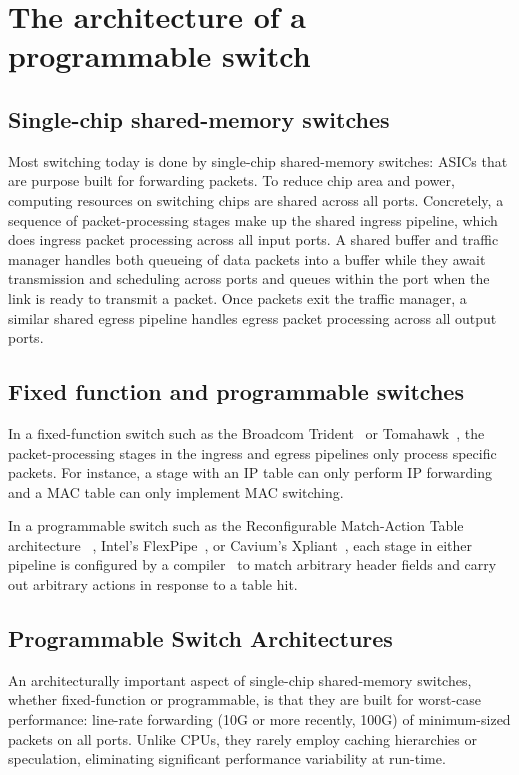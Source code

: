 \section{The architecture of a programmable switch}
\label{s:architecture}

\subsection{Single-chip shared-memory switches}

Most switching today is done by single-chip shared-memory switches: ASICs that
are purpose built for forwarding packets. To reduce chip area and power,
computing resources on switching chips are shared across all ports.
Concretely, a sequence of packet-processing stages make up the shared ingress
pipeline, which does ingress packet processing across all input ports. A shared
buffer and traffic manager handles both queueing of data packets into a buffer
while they await transmission and scheduling across ports and queues within the
port when the link is ready to transmit a packet. Once packets exit the traffic
manager, a similar shared egress pipeline handles egress packet processing across
all output ports.

\subsection{Fixed function and programmable switches}

In a fixed-function switch such as the Broadcom Trident~\cite{trident} or
Tomahawk~\cite{tomahawk}, the packet-processing stages in the ingress and
egress pipelines only process specific packets. For instance, a stage with an
IP table can only perform IP forwarding and a MAC table can only implement MAC
switching.

In a programmable switch such as the Reconfigurable Match-Action Table
architecture ~\cite{rmt}, Intel's FlexPipe~\cite{flexpipe}, or Cavium's
Xpliant~\cite{xpliant}, each stage in either pipeline is configured by a
compiler~\cite{lavanya_nsdi} to match arbitrary header fields and carry out
arbitrary actions in response to a table hit.

\subsection{Programmable Switch Architectures}
An architecturally important aspect of single-chip shared-memory switches,
whether fixed-function or programmable, is that they are built for worst-case
performance: line-rate forwarding (10G or more recently, 100G) of minimum-sized
packets on all ports. Unlike CPUs, they rarely employ caching hierarchies or
speculation, eliminating significant performance variability at run-time.

